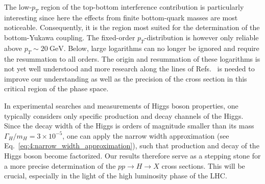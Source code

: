 The low-$p_T$ region of the top-bottom interference contribution is particularly interesting since here the effects from finite bottom-quark masses are most noticeable. Consequently, it is the region most suited for the determination of the bottom-Yukawa coupling. The fixed-order $p_T$-distribution is however only reliable above $p_T \sim 20 \ \mathrm{GeV}$. Below, large logarithms can no longer be ignored and require the resummation to all orders. The origin and resummation of these logarithms is not yet well understood and more research along the lines of Refs.~\cite{Caola:2018zye, Liu:2017vkm} is needed to improve our understanding as well as the precision of the cross section in this critical region of the phase space.

In experimental searches and measurements of Higgs boson properties, one typically considers only specific production and decay channels of the Higgs. Since the decay width of the Higgs is orders of magnitude smaller than its mass $\Gamma_H /m_H = 3 \times 10^{-5}$, one can apply the narrow width approximation (see Eq.~\eqref{eq:4:narrow_width_approximation}), such that production and decay of the Higgs boson become factorized. Our results therefore serve as a stepping stone for a more precise determination of the $pp \rightarrow H \rightarrow X$ cross sections. This will be crucial, especially in the light of the high luminosity phase of the \acs{LHC}.